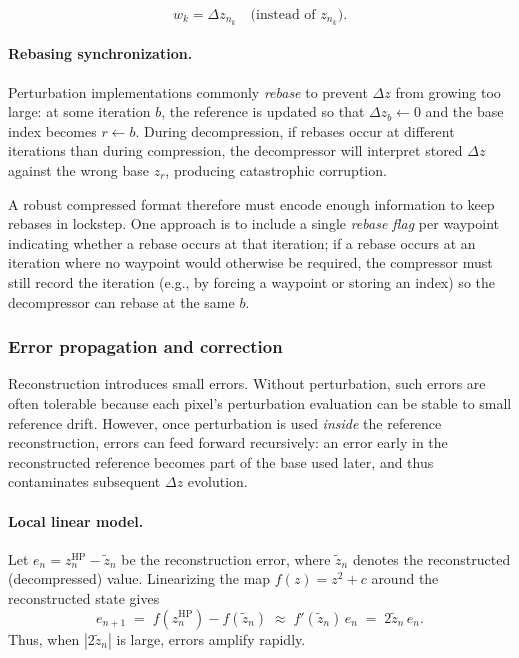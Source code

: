 \begin{equation}
  w_k = \Delta z_{n_k} \quad\text{(instead of } z_{n_k}\text{)}.
  \label{eq:pert-waypoint-payload}
\end{equation}

\paragraph{Rebasing synchronization.}
Perturbation implementations commonly \emph{rebase} to prevent \(\Delta z\) from
growing too large: at some iteration \(b\), the reference is updated so that
\(\Delta z_b \leftarrow 0\) and the base index becomes \(r \leftarrow b\).
During decompression, if rebases occur at different iterations than during
compression, the decompressor will interpret stored \(\Delta z\) against the
wrong base \(z_r\), producing catastrophic corruption.

A robust compressed format therefore must encode enough information to keep
rebases in lockstep.  One approach is to include a single \emph{rebase flag} per
waypoint indicating whether a rebase occurs at that iteration; if a rebase
occurs at an iteration where no waypoint would otherwise be required, the
compressor must still record the iteration (e.g., by forcing a waypoint or
storing an index) so the decompressor can rebase at the same \(b\).

\subsubsection{Error propagation and correction}

Reconstruction introduces small errors.  Without perturbation, such errors are
often tolerable because each pixel's perturbation evaluation can be stable to
small reference drift.  However, once perturbation is used \emph{inside} the
reference reconstruction, errors can feed forward recursively: an error early in
the reconstructed reference becomes part of the base used later, and thus
contaminates subsequent \(\Delta z\) evolution.

\paragraph{Local linear model.}
Let \(e_n = z_n^{\mathrm{HP}} - \tilde z_n\) be the reconstruction error, where
\(\tilde z_n\) denotes the reconstructed (decompressed) value.  Linearizing the
map \(f(z)=z^2+c\) around the reconstructed state gives
\begin{equation}
  e_{n+1}
  \;=\; f(z_n^{\mathrm{HP}}) - f(\tilde z_n)
  \;\approx\; f'(\tilde z_n)\, e_n
  \;=\; 2\tilde z_n\, e_n.
  \label{eq:error-forward}
\end{equation}
Thus, when \(|2\tilde z_n|\) is large, errors amplify rapidly.

